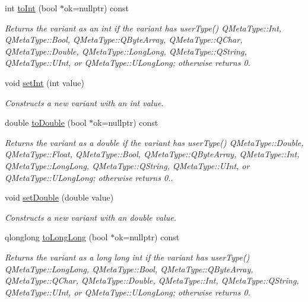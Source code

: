 \begin{DoxyCompactItemize}
\item 
int \hyperlink{class_variant_ae38d113834d5d53ca9c7f36366a25288}{to\+Int} (bool $\ast$ok=nullptr) const
\begin{DoxyCompactList}\small\item\em Returns the variant as an int if the variant has user\+Type() Q\+Meta\+Type\+::\+Int, Q\+Meta\+Type\+::\+Bool, Q\+Meta\+Type\+::\+Q\+Byte\+Array, Q\+Meta\+Type\+::\+Q\+Char, Q\+Meta\+Type\+::\+Double, Q\+Meta\+Type\+::\+Long\+Long, Q\+Meta\+Type\+::\+Q\+String, Q\+Meta\+Type\+::\+U\+Int, or Q\+Meta\+Type\+::\+U\+Long\+Long; otherwise returns 0. \end{DoxyCompactList}\item 
\mbox{\label{class_variant_aa4fe139cfa2b949c68fd2cc61118dd12}} 
void \hyperlink{class_variant_aa4fe139cfa2b949c68fd2cc61118dd12}{set\+Int} (int value)
\begin{DoxyCompactList}\small\item\em Constructs a new variant with an int value. \end{DoxyCompactList}\item 
double \hyperlink{class_variant_a543a5e6579cea7fcd8e6413921e8fd44}{to\+Double} (bool $\ast$ok=nullptr) const
\begin{DoxyCompactList}\small\item\em Returns the variant as a double if the variant has user\+Type() Q\+Meta\+Type\+::\+Double, Q\+Meta\+Type\+::\+Float, Q\+Meta\+Type\+::\+Bool, Q\+Meta\+Type\+::\+Q\+Byte\+Array, Q\+Meta\+Type\+::\+Int, Q\+Meta\+Type\+::\+Long\+Long, Q\+Meta\+Type\+::\+Q\+String, Q\+Meta\+Type\+::\+U\+Int, or Q\+Meta\+Type\+::\+U\+Long\+Long; otherwise returns 0.. \end{DoxyCompactList}\item 
\mbox{\label{class_variant_a9cf99c99f688ecafaf0ccfe1fb6aee52}} 
void \hyperlink{class_variant_a9cf99c99f688ecafaf0ccfe1fb6aee52}{set\+Double} (double value)
\begin{DoxyCompactList}\small\item\em Constructs a new variant with an double value. \end{DoxyCompactList}\item 
qlonglong \hyperlink{class_variant_ad6c7084a71cb3189d302160a160bb36b}{to\+Long\+Long} (bool $\ast$ok=nullptr) const
\begin{DoxyCompactList}\small\item\em Returns the variant as a long long int if the variant has user\+Type() Q\+Meta\+Type\+::\+Long\+Long, Q\+Meta\+Type\+::\+Bool, Q\+Meta\+Type\+::\+Q\+Byte\+Array, Q\+Meta\+Type\+::\+Q\+Char, Q\+Meta\+Type\+::\+Double, Q\+Meta\+Type\+::\+Int, Q\+Meta\+Type\+::\+Q\+String, Q\+Meta\+Type\+::\+U\+Int, or Q\+Meta\+Type\+::\+U\+Long\+Long; otherwise returns 0. \end{DoxyCompactList}\item 

\end{DoxyCompactItemize}

